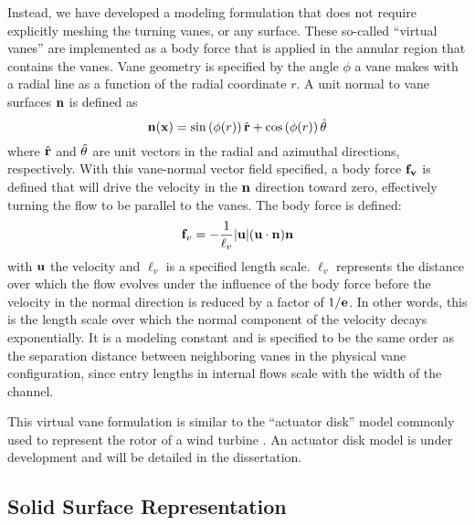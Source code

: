 
Instead, we have developed a modeling formulation that does not require
explicitly meshing the turning vanes, or any surface. These so-called
``virtual vanes'' are implemented as a body force that 
is applied in the annular region that contains the vanes. Vane
geometry is specified by the angle $\phi$ a vane makes with a radial
line as a function of the radial coordinate $r$. A unit normal to vane
surfaces ${\bf n}$ is defined as
%
\begin{equation}
 {\bf n}({\bf x}) = \sin \left(\phi(r) \right) \hat{{\bf r}}+ \cos
  \left(\phi(r) \right) \hat{{\bf \theta}} 
\end{equation}
%
where $\hat{{\bf r}}$ and $\hat{{\bf \theta}}$ are unit
vectors in the radial and azimuthal directions, respectively.
With this vane-normal vector field specified, a body force ${\bf f_v}$
is defined
that will drive the velocity in the ${\bf n}$ direction toward zero,
effectively turning the flow to be parallel to the vanes. The body
force is defined:
\begin{equation}
 {\bf f}_v= -\frac{1}{\ell_v}|{\bf u}|({\bf u}\cdot{\bf n}){\bf n}
 \label{eqn:body_force}
\end{equation}
with ${\bf u}$ the velocity and $\ell_v$ is a specified length
scale. $\ell_v$ represents the distance over which the
flow evolves under the influence of the body force before the
velocity in the normal direction is reduced by a factor of $1/{\bf
e}$. In other words, this is the length scale over which the
normal component of the velocity decays exponentially.
It is a modeling constant and is specified to be
the same order as the separation distance between neighboring vanes in
the physical vane configuration, since entry lengths in internal flows
scale with the width of the channel.

This virtual vane formulation is similar to the ``actuator disk'' model
commonly used to represent the rotor of a wind turbine \cite{betz}. An actuator 
disk model is under development and will be detailed in the dissertation.

\subsection{Solid Surface Representation}
\label{subsec:solid_surface}

